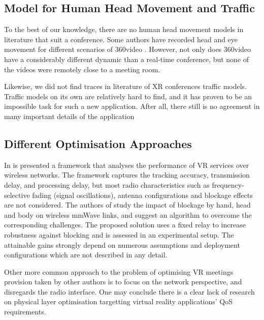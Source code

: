 \subsection*{Model for Human Head Movement and Traffic}

To the best of our knowledge, there are no human head movement models in literature that suit a conference. Some authors have recorded head and eye movement for different scenarios of 360\tdeg video \cite{avtrack360, dataset2}. However, not only does 360\tdeg video have a considerably different dynamic than a real-time conference, but none of the videos were remotely close to a meeting room.

Likewise, we did not find traces in literature of XR conferences traffic models. Traffic models on its own are relatively hard to find, and it has proven to be an impossible task for such a new application. After all, there still is no agreement \cite{3GPP_xr, multi_sensor_tno} in many important details of the application


\subsection*{Different Optimisation Approaches}

In \cite{8395443} is presented a framework that analyses the performance of VR services over wireless networks. The framework captures the tracking accuracy, transmission delay, and processing delay, but most radio characteristics such as frequency-selective fading (signal oscillations), antenna configurations and blockage effects are not considered. The authors of \cite{cutting_the_cord} study the impact of blockage by hand, head and body on wireless \ac{mmWave} links, and suggest an algorithm to overcome the corresponding challenges. The proposed solution uses a fixed relay to increase robustness against blocking and is assessed in an experimental setup. The attainable gains strongly depend on numerous assumptions and deployment configurations which are not described in any detail. 


Other more common approach to the problem of optimising VR meetings provision taken by other authors \cite{7997740, 8319985} is to focus on the network perspective, and disregards the radio interface. One may conclude there is a clear lack of research on physical layer optimisation targetting virtual reality applications' \ac{QoS} requirements. 
